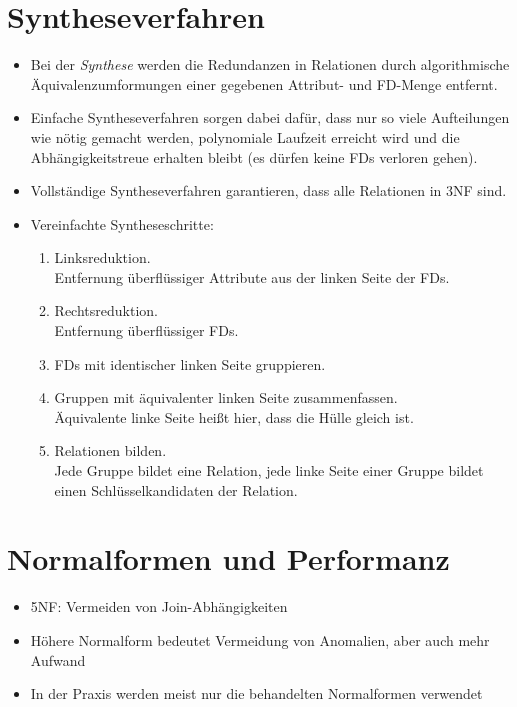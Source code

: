 	\section{Syntheseverfahren} %
		\begin{itemize}
			\item Bei der \textit{Synthese} werden die Redundanzen in Relationen durch algorithmische Äquivalenzumformungen einer gegebenen Attribut- und FD-Menge entfernt.
			\item Einfache Syntheseverfahren sorgen dabei dafür, dass nur so viele Aufteilungen wie nötig gemacht werden, polynomiale Laufzeit erreicht wird und die Abhängigkeitstreue erhalten bleibt (es dürfen keine FDs verloren gehen).
			\item Vollständige Syntheseverfahren garantieren, dass alle Relationen in 3NF sind.
			\item Vereinfachte Syntheseschritte:
				\begin{enumerate}
					\item Linksreduktion. \\ Entfernung überflüssiger Attribute aus der linken Seite der FDs.
					\item Rechtsreduktion. \\ Entfernung überflüssiger FDs.
					\item FDs mit identischer linken Seite gruppieren.
					\item Gruppen mit äquivalenter linken Seite zusammenfassen. \\ Äquivalente linke Seite heißt hier, dass die Hülle gleich ist.
					\item Relationen bilden. \\ Jede Gruppe bildet eine Relation, jede linke Seite einer Gruppe bildet einen Schlüsselkandidaten der Relation.
				\end{enumerate}
		\end{itemize}

	\section{Normalformen und Performanz} %
		\begin{itemize}
			\item 5NF: Vermeiden von Join-Abhängigkeiten
			\item Höhere Normalform bedeutet Vermeidung von Anomalien, aber auch mehr Aufwand
			\item In der Praxis werden meist nur die behandelten Normalformen verwendet
		\end{itemize}

